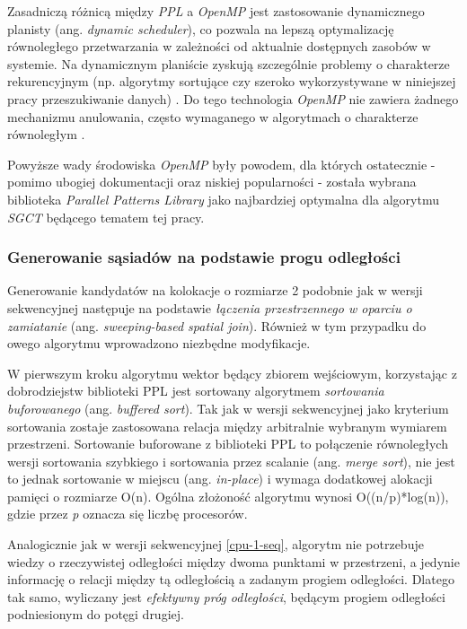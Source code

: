 \documentclass[12pt]{article}
\newcounter{algorytm}
\begin{document}
Zasadniczą różnicą między \textit{PPL} a \textit{OpenMP} jest zastosowanie dynamicznego planisty (ang. \textit{dynamic scheduler}), co pozwala na lepszą optymalizację równoległego przetwarzania w zależności od aktualnie dostępnych zasobów w systemie. Na dynamicznym planiście zyskują szczególnie problemy o charakterze rekurencyjnym (np. algorytmy sortujące czy szeroko wykorzystywane w niniejszej pracy przeszukiwanie danych) \cite{mikromiekki}. Do tego technologia \textit{OpenMP} nie zawiera żadnego mechanizmu anulowania, często wymaganego w algorytmach o charakterze równoległym \cite{stak}.

Powyższe wady środowiska \textit{OpenMP} były powodem, dla których ostatecznie - pomimo ubogiej dokumentacji oraz niskiej popularności -  została wybrana biblioteka \textit{Parallel Patterns Library} jako najbardziej optymalna dla algorytmu \textit{SGCT} będącego tematem tej pracy.

\subsubsection{Generowanie sąsiadów na podstawie progu odległości}

Generowanie kandydatów na kolokacje o rozmiarze 2 podobnie jak w wersji sekwencyjnej następuje na podstawie \textit{łączenia przestrzennego w oparciu o zamiatanie} (ang. \textit{sweeping-based spatial join}). Również w tym przypadku do owego algorytmu wprowadzono niezbędne modyfikacje.

W pierwszym kroku algorytmu wektor będący zbiorem wejściowym, korzystając z dobrodziejstw biblioteki PPL jest sortowany algorytmem \textit{sortowania buforowanego} (ang. \textit{buffered sort}). Tak jak w wersji sekwencyjnej jako kryterium sortowania zostaje zastosowana relacja między arbitralnie wybranym wymiarem przestrzeni. Sortowanie buforowane z biblioteki PPL to połączenie równoległych wersji sortowania szybkiego i sortowania przez scalanie (ang. \textit{merge sort}), nie jest to jednak sortowanie w miejscu (ang. \textit{in-place}) i wymaga dodatkowej alokacji pamięci o rozmiarze O(n). Ogólna złożoność algorytmu wynosi O((n/p)*log(n)), gdzie przez \textit{p} oznacza się liczbę procesorów.

Analogicznie jak w wersji sekwencyjnej \ref{cpu-1-seq}, algorytm nie potrzebuje wiedzy o rzeczywistej odległości między dwoma punktami w przestrzeni, a jedynie informację o relacji między tą odległością a zadanym progiem odległości. Dlatego tak samo, wyliczany jest \textit{efektywny próg odległości}, będącym progiem odległości podniesionym do potęgi drugiej.
\end{document}
